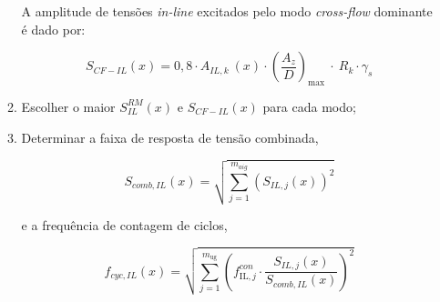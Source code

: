 \begin{itemize}
\begin{enumerate}

        A amplitude de tensões \textit{in-line} excitados pelo modo \textit{cross-flow} dominante é dado por:

       	    \[S_{\mathit{CF-IL}}(x) = 0,8 \cdot A_{\mathit{IL}, \mathit{k}}~(x) \cdot {\left(\frac{A_{z}}{D}\right)}_{\max}~\cdot~R_k \cdot \gamma_s\]

    \item  Escolher o maior $S_\mathit{IL}^\mathit{RM}(x)$ e $S_{\mathit{CF-IL}}(x)$ para cada modo;

    \item Determinar a faixa de resposta de tensão combinada,

    \[S_{comb,IL}(x)=\sqrt{\sum_{j=1}^{m_{aig}}{\left(S_{IL,j}(x)\right)}^{2}}\]

    e a frequência de contagem de ciclos,

    \[f_{cyc,IL}(x)=\sqrt{\sum_{j=1}^{m_{\text{ug}}}{\left(f_{\text {IL}, j}^{con} \cdot \frac{S_{IL,j}(x)}{S_{comb,IL}(x)}\right)}^{2}}\]
    \end{enumerate}
\end{itemize}
